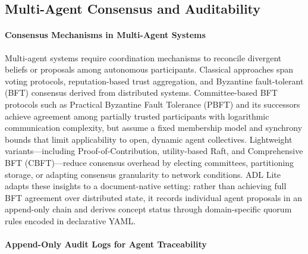 \subsection{Multi-Agent Consensus and Auditability}\label{multi-agent-consensus-and-auditability}

\paragraph{Consensus Mechanisms in Multi-Agent Systems}\label{consensus-mechanisms-in-multi-agent-systems}

Multi-agent systems require coordination mechanisms to reconcile divergent beliefs or proposals among autonomous participants. Classical approaches span voting protocols, reputation-based trust aggregation, and Byzantine fault-tolerant (BFT) consensus derived from distributed systems\cite{ref23}. Committee-based BFT protocols such as Practical Byzantine Fault Tolerance (PBFT) and its successors achieve agreement among partially trusted participants with logarithmic communication complexity, but assume a fixed membership model and synchrony bounds that limit applicability to open, dynamic agent collectives\cite{ref24}. Lightweight variants---including Proof-of-Contribution\cite{ref25}, utility-based Raft\cite{ref26}, and Comprehensive BFT (CBFT)\cite{ref24}---reduce consensus overhead by electing committees, partitioning storage, or adapting consensus granularity to network conditions. ADL Lite adapts these insights to a document-native setting: rather than achieving full BFT agreement over distributed state, it records individual agent proposals in an append-only chain and derives concept status through domain-specific quorum rules encoded in declarative YAML.

\paragraph{Append-Only Audit Logs for Agent Traceability}\label{append-only-audit-logs-for-agent-traceability}

